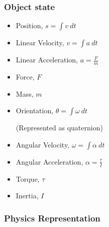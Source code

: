 \documentclass[a4paper]{article}
\begin{document}
\subsubsection{Object state}

\begin{itemize}
  \item
    Position, $s = \int v \: dt$

  \item
    Linear Velocity, $v = \int a \: dt$

  \item
    Linear Acceleration, $a = \frac{F}{m}$

  \item
    Force, $F$

  \item
    Mass, $m$

  \item
    Orientation, $\theta = \int \omega \: dt$

    (Represented as quaternion)

  \item
    Angular Velocity, $\omega = \int \alpha \: dt$

  \item
    Angular Acceleration, $\alpha = \frac{\tau}{I}$

  \item
    Torque, $\tau$

  \item
    Inertia, $I$

\end{itemize}

\subsubsection{Physics Representation}
\end{document}
